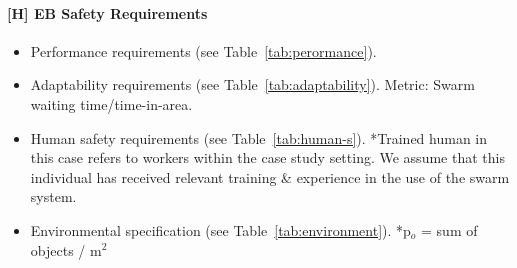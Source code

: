 \documentclass[lettersize,journal]{IEEEtran}
\begin{document}
\paragraph*{[H] EB Safety Requirements}
\begin{itemize}
	\item Performance requirements (see Table~\ref{tab:perormance}).
	\item Adaptability requirements (see Table~\ref{tab:adaptability}). Metric: Swarm waiting time/time-in-area.
	\item Human safety requirements (see Table~\ref{tab:human-s}). *Trained human in this case refers to workers within the case study setting. We assume that this individual has received relevant training \& experience in the use of the swarm system.
	\item Environmental specification (see Table~\ref{tab:environment}). *p$_o$ = sum of objects  / m$^2$
\end{itemize}
\end{document}
